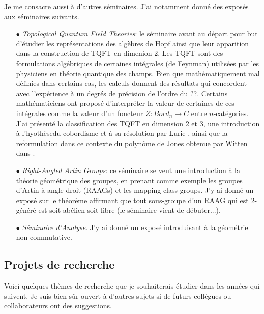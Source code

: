 \documentclass[a4paper,11pt]{article}
\begin{document}
Je me consacre aussi \`a d'autres s\'eminaires. J'ai notamment donn\'e des expos\'es aux s\'eminaires suivants.\\

\begin{itemize}
\item[$\bullet$] \textit{Topological Quantum Field Theories}: le s\'eminaire avant au d\'epart pour but d'\'etudier les repr\'esentations des alg\`ebres de Hopf ainsi que leur apparition dans la construction de TQFT en dimenion 2. Les TQFT sont des formulations alg\'ebriques de certaines int\'egrales (de Feynman) utilis\'ees par les physiciens en th\'eorie quantique des champs. Bien que math\'ematiquement mal d\'efinies dans certains cas, les calculs donnent des r\'esultats qui concordent avec l'exp\'erience \`a un degr\'es de pr\'ecision de l'ordre du ??. Certains math\'ematiciens ont propos\'e d'interpr\'eter la valeur de certaines de ces int\'egrales comme la valeur d'un foncteur $Z : Bord_n \rightarrow C$ entre $n$-cat\'egories.  J'ai pr\'esent\'e la classification des TQFT en dimension 2 et 3, une introduction \`a l'hyoth\`esedu cobordisme et \`a sa r\'esolution par Lurie \cite{Lurie}, ainsi que la reformulation dans ce contexte du polyn\^ome de Jones obtenue par Witten dans \cite{WittenJones}.\\

\item[$\bullet$] \textit{Right-Angled Artin Groups}: ce s\'eminaire se veut une introduction \`a la th\'eorie g\'eom\'etrique des groupes, en prenant comme exemple les groupes d'Artin \`a angle droit (RAAGs) et les mapping class groups. J'y ai donn\'e un expos\'e sur le th\'eor\`eme affirmant que tout sous-groupe d'un RAAG qui est 2-g\'en\'er\'e est soit ab\'elien soit libre (le s\'eminaire vient de d\'ebuter...).\\

\item[$\bullet$] \textit{S\'eminaire d'Analyse}. J'y ai donn\'e un expos\'e introduisant \`a la g\'eom\'etrie non-commutative.
\end{itemize}

\subsection*{Projets de recherche}

Voici quelques th\`emes de recherche que je souhaiterais \'etudier dans les ann\'ees qui suivent. Je suis bien s\^ur ouvert \`a d'autres sujets si de futurs coll\`egues ou collaborateurs ont des suggestions.\\
\end{document}
